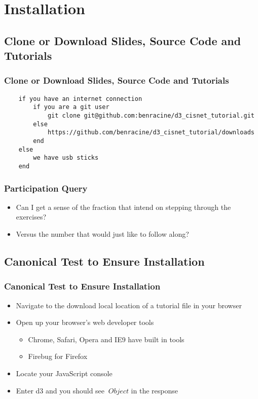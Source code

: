 \documentclass{beamer}
\begin{document}
\section{Installation}

\subsection{Clone or Download Slides, Source Code and Tutorials}

\begin{frame}[fragile]
    \frametitle{Clone or Download Slides, Source Code and Tutorials}
        \tiny{
        \begin{verbatim}
    if you have an internet connection
        if you are a git user
            git clone git@github.com:benracine/d3_cisnet_tutorial.git
        else
            https://github.com/benracine/d3_cisnet_tutorial/downloads
        end
    else
        we have usb sticks
    end
        \end{verbatim}
        }
\end{frame}



\begin{frame}[fragile]
    \frametitle{Participation Query}
    \begin{itemize}
    \item Can I get a sense of the fraction that intend on stepping through the exercises?
\pause
    \item Versus the number that would just like to follow along?
    \end{itemize}
\end{frame}


\subsection{Canonical Test to Ensure Installation}

\begin{frame}
    \frametitle{Canonical Test to Ensure Installation}
    \begin{itemize}
\pause
    \item Navigate to the download local location of a tutorial file in your browser
\pause
    \item Open up your browser's web developer tools
        \begin{itemize}
        \item Chrome, Safari, Opera and IE9 have built in tools
        \item Firebug for Firefox
        \end{itemize}
\pause
    \item Locate your JavaScript console
\pause
    \item Enter d3 and you should see $\> Object $ in the response
    \end{itemize}
\end{frame}
\end{document}
